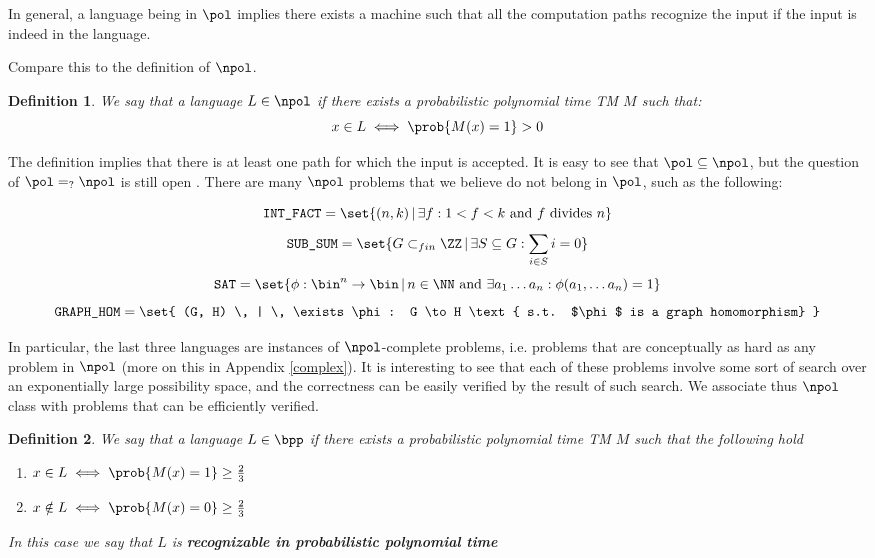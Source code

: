 \documentclass{article}
\newtheorem{definition}{Definition}
\begin{document}
In general, a language being in $\pol$ implies there exists a machine such that all the computation paths recognize the input if the input is indeed in the language. \par

Compare this to the definition of $\npol$.

\begin{definition}
    We say that a language $L \in \npol$ if there exists a probabilistic polynomial time TM $M$ such that:
    \[x \in L \iff \prob{M(x) = 1} > 0\]
\end{definition}

The definition implies that there is at least one path for which the input is accepted. It is easy to see that $\pol \subseteq \npol$, but the question of $\pol =_? \npol$ is still open \cite{cookComplexityTheoremprovingProcedures1971} \cite{jaffeMillenniumGrandChallenge2006}. There are many $\npol$ problems that we believe do not belong in $\pol$, such as the following:

\[ \texttt{INT\_FACT} = \set{ (n, k) \, | \, \exists f : 1 < f < k \text { and } f \text{ divides } n}\]
\[ \texttt{SUB\_SUM} = \set{ G \subset_{fin} \ZZ \, | \, \exists S \subseteq G : \sum_{i \in S} i = 0  } \]
\[ \texttt{SAT} = \set{ \phi : \bin^n \to \bin \, | \, n \in \NN \text{ and } \exists a_1 \dots a_n : \phi(a_1, \dots a_n) = 1 } \]
\[ \texttt{GRAPH\_HOM} = \set{ (G, H) \, | \, \exists \phi : G \to H \text{ s.t. $\phi$ is a graph homomorphism} }\]

In particular, the last three languages are instances of $\npol$-complete problems, i.e. problems that are conceptually as hard as any problem in $\npol$ (more on this in Appendix \ref{complex}). It is interesting to see that each of these problems involve some sort of search over an exponentially large possibility space, and the correctness can be easily verified by the result of such search. We associate thus $\npol$ class with problems that can be efficiently verified.

\begin{definition}
    We say that a language $L \in \bpp$ if there exists a probabilistic polynomial time TM $M$ such that the following hold
    \begin{enumerate}
        \item $x \in L \iff \prob{M(x) = 1} \geq \frac{2}{3}$
        \item $x \notin L \iff \prob{M(x) = 0} \geq \frac{2}{3}$
    \end{enumerate}
    In this case we say that $L$ is \textbf{recognizable in probabilistic polynomial time}
\end{definition}
\end{document}
